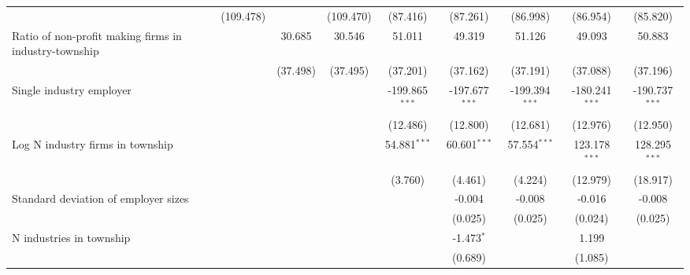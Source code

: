 \begin{tabular}{lcccccccc}
                                                         & (109.478)       &                 & (109.470)       & (87.416)         & (87.261)         & (86.998)         & (86.954)         & (85.820)\\   
   Ratio of non-profit making firms in industry-township &                 & 30.685          & 30.546          & 51.011           & 49.319           & 51.126           & 49.093           & 50.883\\   
                                                         &                 & (37.498)        & (37.495)        & (37.201)         & (37.162)         & (37.191)         & (37.088)         & (37.196)\\   
   Single industry employer                              &                 &                 &                 & -199.865$^{***}$ & -197.677$^{***}$ & -199.394$^{***}$ & -180.241$^{***}$ & -190.737$^{***}$\\   
                                                         &                 &                 &                 & (12.486)         & (12.800)         & (12.681)         & (12.976)         & (12.950)\\   
   Log N industry firms in township                      &                 &                 &                 & 54.881$^{***}$   & 60.601$^{***}$   & 57.554$^{***}$   & 123.178$^{***}$  & 128.295$^{***}$\\   
                                                         &                 &                 &                 & (3.760)          & (4.461)          & (4.224)          & (12.979)         & (18.917)\\   
   Standard deviation of employer sizes                  &                 &                 &                 &                  & -0.004           & -0.008           & -0.016           & -0.008\\   
                                                         &                 &                 &                 &                  & (0.025)          & (0.025)          & (0.024)          & (0.025)\\   
   N industries in township                              &                 &                 &                 &                  & -1.473$^{*}$     &                  & 1.199            &   \\   
                                                         &                 &                 &                 &                  & (0.689)          &                  & (1.085)          &   \\   

\end{tabular}
